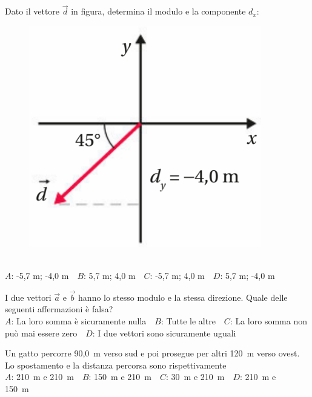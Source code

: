 \mcquestionheader Dato il vettore $\vec{d}$ in figura, determina il modulo e la componente $d_x$: \begin{figure}[h!]   \begin{center}     \includegraphics[scale=0.35]{vettored.png}   \end{center} \end{figure}\\
{$A$}: -5,7 m; -4,0 m\ \ {$B$}: 5,7 m; 4,0 m\ \ {$C$}: -5,7 m; 4,0 m\ \ {$D$}: 5,7 m; -4,0 m\ \ 

\mcquestionfooter



\def\mcquestionnumber{10}


\mcquestionheader I due vettori $\vec{a}$ e $\vec{b}$ hanno lo stesso modulo e la stessa direzione. Quale delle seguenti affermazioni è falsa?\\
{$A$}: La loro somma è sicuramente nulla\ \ {$B$}: Tutte le altre\ \ {$C$}: La loro somma non può mai essere zero\ \ {$D$}: I due vettori sono sicuramente uguali\ \ 

\mcquestionfooter



\def\mcquestionnumber{11}


\mcquestionheader Un gatto percorre 90,0~m verso sud e poi prosegue per altri 120~m verso ovest. Lo spostamento e la distanza percorsa sono rispettivamente\\
{$A$}: 210~m e 210~m\ \ {$B$}: 150~m e 210~m\ \ {$C$}: 30~m e 210~m\ \ {$D$}: 210~m e 150~m\ \ 

\mcquestionfooter



